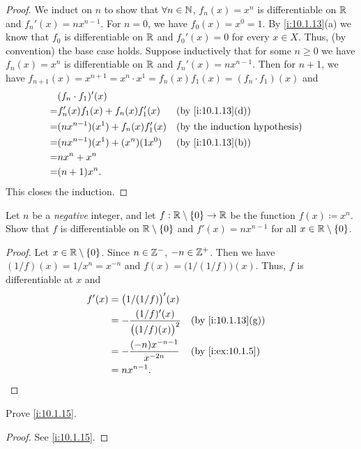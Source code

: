 \begin{proof}
  We induct on \(n\) to show that \(\forall n \in \mathbb{N}\), \(f_n(x) = x^n\) is differentiable on \(\mathbb{R}\) and \(f_n'(x) = n x^{n - 1}\).
  For \(n = 0\), we have \(f_0(x) = x^0 = 1\).
  By \cref{i:10.1.13}(a) we know that \(f_0\) is differentiable on \(\mathbb{R}\) and \(f_0'(x) = 0\) for every \(x \in X\).
  Thus, (by convention) the base case holds.
  Suppose inductively that for some \(n \geq 0\) we have \(f_n(x) = x^n\) is differentiable on \(\mathbb{R}\) and \(f_n'(x) = n x^{n - 1}\).
  Then for \(n + 1\), we have \(f_{n + 1}(x) = x^{n + 1} = x^n \cdot x^1 = f_n(x) f_1(x) = (f_n \cdot f_1)(x)\) and
  \begin{align*}
      & (f_n \cdot f_1)'(x)                                        \\
    = & f_n'(x) f_1(x) + f_n(x) f_1'(x)     &  & \by{i:10.1.13}[d] \\
    = & (n x^{n - 1})(x^1) + f_n(x) f_1'(x) &  & \byIH             \\
    = & (n x^{n - 1})(x^1) + (x^n)(1 x^0)   &  & \by{i:10.1.13}[b] \\
    = & n x^n + x^n                                                \\
    = & (n + 1) x^n.
  \end{align*}
  This closes the induction.
\end{proof}

\begin{ex}\label{i:ex:10.1.6}
  Let \(n\) be a \emph{negative} integer, and let \(f : \mathbb{R} \setminus \left\lbrace0\right\rbrace \to \mathbb{R}\) be the function \(f(x) \coloneqq x^n\).
  Show that \(f\) is differentiable on \(\mathbb{R} \setminus \left\lbrace0\right\rbrace\) and \(f'(x) = n x^{n - 1}\) for all \(x \in \mathbb{R} \setminus \left\lbrace0\right\rbrace\).
\end{ex}

\begin{proof}
  Let \(x \in \mathbb{R} \setminus \left\lbrace0\right\rbrace\).
  Since \(n \in \mathbb{Z}^-\), \(-n \in \mathbb{Z}^+\).
  Then we have \((1 / f)(x) = 1 / x^n = x^{-n}\) and \(f(x) = \big(1 / (1 / f)\big)(x)\).
  Thus, \(f\) is differentiable at \(x\) and
  \begin{align*}
    f'(x) & = \big(1 / (1 / f)\big)'(x)                                           \\
          & = -\dfrac{(1 / f)'(x)}{\big((1 / f)(x)\big)^2} &  & \by{i:10.1.13}[g] \\
          & = -\dfrac{(-n) x^{-n - 1}}{x^{-2n}}            &  & \by{i:ex:10.1.5}  \\
          & = n x^{n - 1}.
  \end{align*}
\end{proof}

\begin{ex}\label{i:ex:10.1.7}
  Prove \cref{i:10.1.15}.
\end{ex}

\begin{proof}
  See \cref{i:10.1.15}.
\end{proof}
